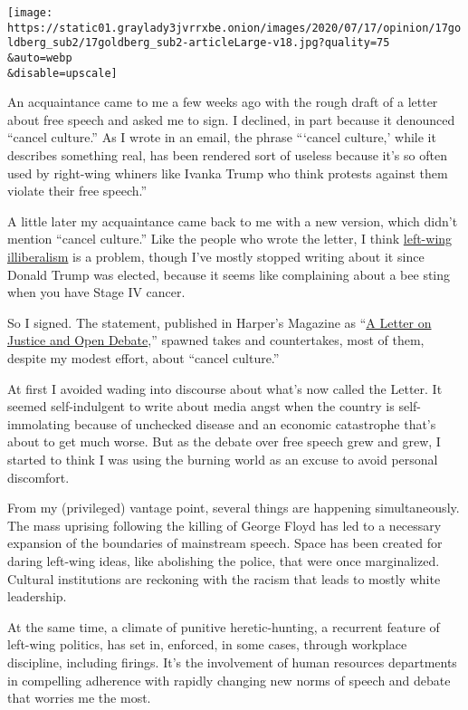 \texttt{[image: https://static01.graylady3jvrrxbe.onion/images/2020/07/17/opinion/17goldberg\_sub2/17goldberg\_sub2-articleLarge-v18.jpg?quality=75\\\&auto=webp\\\&disable=upscale]}

An acquaintance came to me a few weeks ago with the rough draft of a
letter about free speech and asked me to sign. I declined, in part
because it denounced ``cancel culture.'' As I wrote in an email, the
phrase ```cancel culture,' while it describes something real, has been
rendered sort of useless because it's so often used by right-wing
whiners like Ivanka Trump who think protests against them violate their
free speech.''

A little later my acquaintance came back to me with a new version, which
didn't mention ``cancel culture.'' Like the people who wrote the letter,
I think
\href{https://www.thenation.com/article/archive/cancelcolbert-and-return-anti-liberal-left/}{left-wing
illiberalism} is a problem, though I've mostly stopped writing about it
since Donald Trump was elected, because it seems like complaining about
a bee sting when you have Stage IV cancer.

So I signed. The statement, published in Harper's Magazine as
``\href{https://harpers.org/a-letter-on-justice-and-open-debate/}{A
Letter on Justice and Open Debate},'' spawned takes and countertakes,
most of them, despite my modest effort, about ``cancel culture.''

At first I avoided wading into discourse about what's now called the
Letter. It seemed self-indulgent to write about media angst when the
country is self-immolating because of unchecked disease and an economic
catastrophe that's about to get much worse. But as the debate over free
speech grew and grew, I started to think I was using the burning world
as an excuse to avoid personal discomfort.

From my (privileged) vantage point, several things are happening
simultaneously. The mass uprising following the killing of George Floyd
has led to a necessary expansion of the boundaries of mainstream speech.
Space has been created for daring left-wing ideas, like abolishing the
police, that were once marginalized. Cultural institutions are reckoning
with the racism that leads to mostly white leadership.

At the same time, a climate of punitive heretic-hunting, a recurrent
feature of left-wing politics, has set in, enforced, in some cases,
through workplace discipline, including firings. It's the involvement of
human resources departments in compelling adherence with rapidly
changing new norms of speech and debate that worries me the most.

